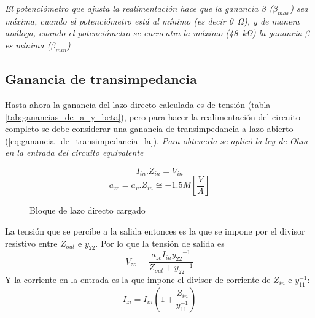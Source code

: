 \documentclass[letterpaper, 10 pt, conference]{ieeeconf}  %
\begin{document}
\textit{El potenciómetro que ajusta la realimentación hace que la ganancia $\beta$ ($\beta_{max}$) sea máxima, cuando el potenciómetro está al mínimo (es decir \qty{0}{\ohm}), y de manera análoga, cuando el potenciómetro se encuentra la máximo (\qty{48}{\kilo\ohm}) la ganancia $\beta$ es mínima ($\beta_{min}$)}

\subsection{Ganancia de transimpedancia}
Hasta ahora la ganancia del lazo directo calculada es de tensión (tabla \ref{tab:ganancias_de_a_y_beta}), pero para hacer la realimentación del circuito completo se debe considerar una ganancia de transimpedancia a lazo abierto (\ref{eq:ganancia_de_transimpedancia_la}). \textit{Para obtenerla se aplicó la ley de Ohm en la entrada del circuito equivalente}

\[ I_{in} . Z_{in} = V_{in} \]
\begin{equation}
  a_{zc} = a_{v} . Z_{in} \cong -1.5 M \left[ \frac{V}{A} \right]
  \label{eq:ganancia_de_transimpedancia_la}
\end{equation} 

\begin{figure}[H]
  \centering
  \caption{Bloque de lazo directo cargado}
  \label{diag:bloque_a_cargado}
\end{figure}

La tensión que se percibe a la salida entonces es la que se impone por el divisor resistivo entre $Z_{out}$ e $y_{22}$. Por lo que la tensión de salida es
\[ V_{zo} = \frac{a_{zc}I_{in}{y_{22}}^{-1}}{Z_{out} + {y_{22}}^{-1}} \]
Y la corriente en la entrada es la que impone el divisor de corriente de $Z_{in}$ e $y_{11}^{-1}$:
\[ I_{zi} = I_{in}\left( 1 + \frac{Z_{in}}{y_{11}^{-1}} \right) \]
\end{document}
